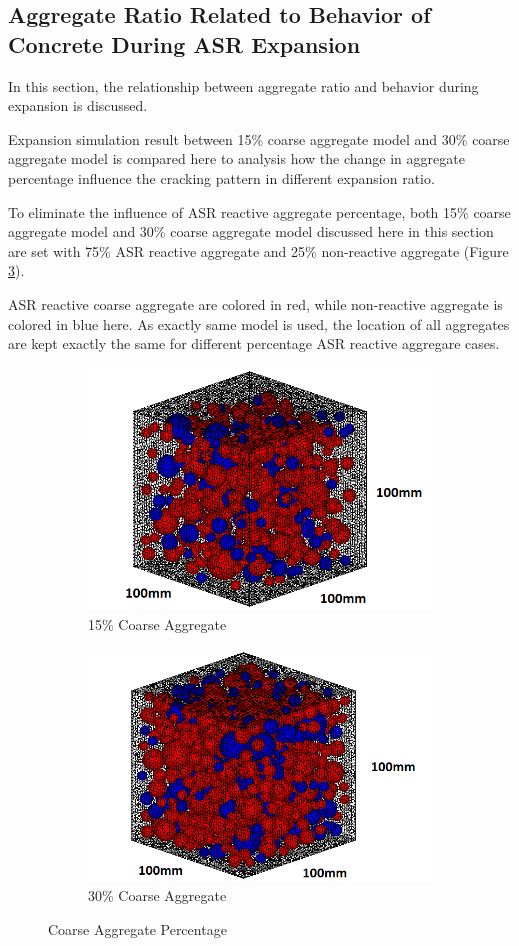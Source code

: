 \clearpage
\subsection{Aggregate Ratio Related to Behavior of Concrete During ASR Expansion}
In this section, the relationship between aggregate ratio and behavior during expansion is discussed.

Expansion simulation result between 15\% coarse aggregate model and 30\% coarse aggregate model is compared here to analysis how the change in aggregate percentage influence the cracking pattern in different expansion ratio.

To eliminate the influence of ASR reactive aggregate percentage, both 15\% coarse aggregate model and 30\% coarse aggregate model discussed here in this section are set with 75\% ASR  reactive aggregate and 25\% non-reactive aggregate (Figure \ref{fig:Aggregate_Percentagefff}).

ASR reactive coarse aggregate are colored in red, while non-reactive aggregate is colored in blue here. As exactly same model is used, the location of all aggregates are kept exactly the same for different percentage ASR reactive aggregare cases.

\begin{figure}[!h]
\centering
\begin{subfigure}{.5\textwidth}
  \centering
  \includegraphics[width=.6\linewidth]{Files/Aggregate/A15P75.png}
  \caption{15\% Coarse Aggregate}
  \label{fig:A15_model}
\end{subfigure}%
\begin{subfigure}{.5\textwidth}
  \centering
  \includegraphics[width=.6\linewidth]{Files/Aggregate/A30P75.png}
  \caption{30\% Coarse Aggregate}
  \label{fig:A15_model}
\end{subfigure}
\caption{Coarse Aggregate Percentage}
\label{fig:Aggregate_Percentagefff}
\end{figure}

